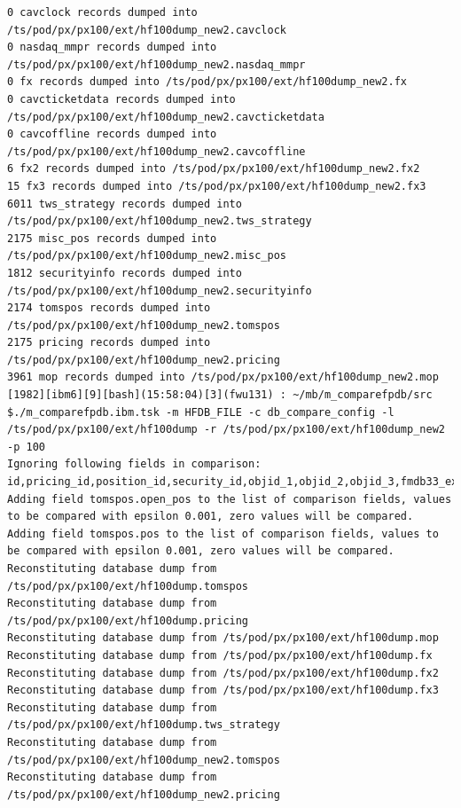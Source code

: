 \documentclass[8pt,]{article}
\begin{document}
\begin{verbatim}
0 cavclock records dumped into /ts/pod/px/px100/ext/hf100dump_new2.cavclock
0 nasdaq_mmpr records dumped into /ts/pod/px/px100/ext/hf100dump_new2.nasdaq_mmpr
0 fx records dumped into /ts/pod/px/px100/ext/hf100dump_new2.fx
0 cavcticketdata records dumped into /ts/pod/px/px100/ext/hf100dump_new2.cavcticketdata
0 cavcoffline records dumped into /ts/pod/px/px100/ext/hf100dump_new2.cavcoffline
6 fx2 records dumped into /ts/pod/px/px100/ext/hf100dump_new2.fx2
15 fx3 records dumped into /ts/pod/px/px100/ext/hf100dump_new2.fx3
6011 tws_strategy records dumped into /ts/pod/px/px100/ext/hf100dump_new2.tws_strategy
2175 misc_pos records dumped into /ts/pod/px/px100/ext/hf100dump_new2.misc_pos
1812 securityinfo records dumped into /ts/pod/px/px100/ext/hf100dump_new2.securityinfo
2174 tomspos records dumped into /ts/pod/px/px100/ext/hf100dump_new2.tomspos
2175 pricing records dumped into /ts/pod/px/px100/ext/hf100dump_new2.pricing
3961 mop records dumped into /ts/pod/px/px100/ext/hf100dump_new2.mop
[1982][ibm6][9][bash](15:58:04)[3](fwu131) : ~/mb/m_comparefpdb/src
$./m_comparefpdb.ibm.tsk -m HFDB_FILE -c db_compare_config -l /ts/pod/px/px100/ext/hf100dump -r /ts/pod/px/px100/ext/hf100dump_new2 -p 100
Ignoring following fields in comparison: id,pricing_id,position_id,security_id,objid_1,objid_2,objid_3,fmdb33_exists,fmdb39_exists,pos_flags,deal_id,dept,subflag,db_status,has_umtm_px,fmdb30_bb_unique_id,id,pricing_id,position_id,security_id,objid_1,objid_2,objid_3,fmdb33_exists,fmdb39_exists,pos_flags,deal_id,dept,subflag,db_status,has_umtm_px,fmdb30_bb_unique_id,can_pool_partial_ppy_assumption,can_pool_refinance_rate,fmdb30_icoc_secinc,faskpx,faskyld,fbidpx,fbidyld,frisk2,frisk4
Adding field tomspos.open_pos to the list of comparison fields, values to be compared with epsilon 0.001, zero values will be compared.
Adding field tomspos.pos to the list of comparison fields, values to be compared with epsilon 0.001, zero values will be compared.
Reconstituting database dump from /ts/pod/px/px100/ext/hf100dump.tomspos
Reconstituting database dump from /ts/pod/px/px100/ext/hf100dump.pricing
Reconstituting database dump from /ts/pod/px/px100/ext/hf100dump.mop
Reconstituting database dump from /ts/pod/px/px100/ext/hf100dump.fx
Reconstituting database dump from /ts/pod/px/px100/ext/hf100dump.fx2
Reconstituting database dump from /ts/pod/px/px100/ext/hf100dump.fx3
Reconstituting database dump from /ts/pod/px/px100/ext/hf100dump.tws_strategy
Reconstituting database dump from /ts/pod/px/px100/ext/hf100dump_new2.tomspos
Reconstituting database dump from /ts/pod/px/px100/ext/hf100dump_new2.pricing

\end{verbatim}
\end{document}
